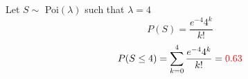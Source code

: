\documentclass{article}
\begin{document}
\begin{enumerate}
        Let $S \sim$ Poi$(\lambda)$ such that $\lambda=4$
        \begin{equation*}
            P(S)=\frac{e^{-4}4^k}{k!}
        \end{equation*}
        \begin{equation*}
            P(S \leq 4)=\sum_{k=0}^4\frac{e^{-4}4^k}{k!}=\textcolor{red}{0.63}
        \end{equation*}
        
    \end{enumerate}
\end{document}
